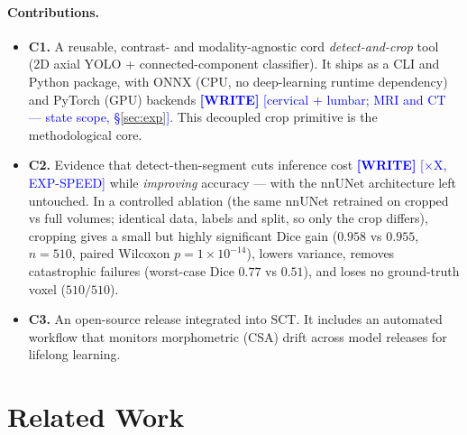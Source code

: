 \documentclass[11pt]{article}
\newcommand{\WRITE}[1]{\textcolor{blue}{\textbf{[WRITE]} #1}}
\newcommand{\DECISION}[1]{\textcolor{red}{\textbf{[DECISION]} #1}}
\begin{document}
\paragraph{Contributions.}
\begin{itemize}
  \item \textbf{C1.} A reusable, contrast- and modality-agnostic cord
        \emph{detect-and-crop} tool (2D axial YOLO + connected-component
        classifier). It ships as a CLI and Python package, with ONNX (CPU, no
        deep-learning runtime dependency) and PyTorch (GPU) backends
        \WRITE{[cervical + lumbar; MRI and CT — state scope, \S\ref{sec:exp}]}.
        This decoupled crop primitive is the methodological core.
  \item \textbf{C2.} Evidence that detect-then-segment cuts inference cost
        \WRITE{[$\times$X, EXP-SPEED]} while \emph{improving} accuracy --- with the
        nnUNet architecture left untouched. In a controlled ablation (the same
        nnUNet retrained on cropped vs full volumes; identical data, labels and
        split, so only the crop differs), cropping gives a small but highly
        significant Dice gain ($0.958$ vs $0.955$, $n=510$, paired Wilcoxon
        $p=1\times10^{-14}$), lowers variance, removes catastrophic failures
        (worst-case Dice $0.77$ vs $0.51$), and loses no ground-truth voxel
        ($510/510$).
  \item \textbf{C3.} An open-source release integrated into SCT. It includes an
        automated workflow that monitors morphometric (CSA) drift across model
        releases for lifelong learning.
\end{itemize}


\section{Related Work}\label{sec:related}
\end{document}
